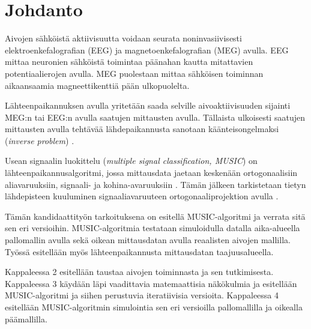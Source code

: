 \section{Johdanto}

Aivojen sähköistä aktiivisuutta voidaan seurata noninvasiivisesti elektroenkefalografian (EEG) ja magnetoenkefalografian (MEG) avulla. EEG mittaa neuronien sähköistä toimintaa päänahan kautta mitattavien potentiaalierojen avulla. MEG puolestaan mittaa sähköisen toiminnan aikaansaamia magneettikenttiä pään ulkopuolelta. \citep{Hamalainen1993MagnetoencephalographytheoryBrain}

Lähteenpaikannuksen avulla yritetään saada selville aivoaktiivisuuden sijainti MEG:n tai EEG:n avulla saatujen mittausten avulla. Tällaista ulkoisesti saatujen mittausten avulla tehtävää lähdepaikannusta sanotaan käänteisongelmaksi (\textit{inverse problem}) \citep[s. 2]{hansen2010meg}.

Usean signaalin luokittelu (\textit{multiple signal classification, MUSIC}) on lähteenpaikannusalgoritmi, jossa mittausdata jaetaan keskenään ortogonaalisiin aliavaruuksiin, signaali- ja kohina-avaruuksiin \citep{Schmidt1986MultipleEstimation}. Tämän jälkeen tarkistetaan tietyn lähdepisteen kuuluminen signaaliavaruuteen ortogonaaliprojektion avulla \citep{Mosher1999SourceMUSIC}.

Tämän kandidaattityön tarkoituksena on esitellä MUSIC-algoritmi ja verrata sitä sen eri versioihin. MUSIC-algoritmia testataan simuloidulla datalla aika-alueella pallomallin avulla sekä oikean mittausdatan avulla reaalisten aivojen mallilla. Työssä esitellään myös lähteenpaikannusta mittausdatan taajuusalueella.

Kappaleessa 2 esitellään taustaa aivojen toiminnasta ja sen tutkimisesta. Kappaleessa 3 käydään läpi vaadittavia matemaattisia näkökulmia ja esitellään MUSIC-algoritmi ja siihen perustuvia iteratiivisia versioita. Kappaleessa 4 esitellään MUSIC-algoritmin simulointia sen eri versioilla pallomallilla ja oikealla päämallilla.